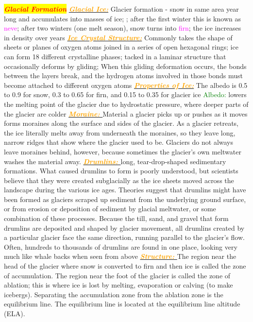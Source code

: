 \documentclass{article}
\author{SBHS Science Olympiad, Gold}
\newcommand{\red}[1]{\textcolor{red}{#1}}
\newcommand{\green}[1]{\textcolor{green}{#1}}
\newcommand{\pink}[1]{\textcolor{magenta}{#1}}
\newcommand{\orange}[1]{\textcolor{orange}{#1}}
\newcommand{\mysection}[1]{\colorbox{yellow}{{\textbf{\textbf{\textit{\red{#1}}}}}}}
\newcommand{\mysub}[1]{\underline{\textbf{{\textit{\orange{#1}}}}}}
\newcommand{\mysubsub}[1]{{{\green{#1}}}}
\newcommand{\vocab}[1]{{\pink{#1}}}
\begin{document}
	 \tiny
	\begin{multicols*}{4}
	
	
	
	
	\mysection{Glacial Formation} %
		\mysub {Glacial Ice:}
		Glacier formation - snow in same area year long and accumulates into masses of ice; ; after the first winter this is known as \vocab{neve}; after two winters (one melt season), snow turns into \vocab{firn}; the ice increases in density over years
		\mysub{Ice Crystal Structure:} 
		Commonly takes the shape of sheets or planes of oxygen atoms joined in a series of open hexagonal rings; ice can form 18 different crystalline phases; tacked in a laminar structure that occasionally deforms by gliding; When this gliding deformation occurs, the bonds between the layers break, and the hydrogen atoms involved in those bonds must become attached to different oxygen atoms
		\mysub{Properties of Ice:} The albedo is 0.5 to 0.9 for snow, 0.3 to 0.65 for firn, and 0.15 to 0.35 for glacier ice
		\mysubsub{Albedo:} lowers the melting point of the glacier due to hydrostatic pressure, where deeper parts of the glacier are colder
		\mysub{Moraine: }
		Material a glacier picks up or pushes as it moves forms moraines along the surface and sides of the glacier. As a glacier retreats, the ice literally melts away from underneath the moraines, so they leave long, narrow ridges that show where the glacier used to be. Glaciers do not always leave moraines behind, however, because sometimes the glacier’s own meltwater washes the material away.
		\mysub{Drumlins: } long, tear-drop-shaped sedimentary formations. What caused drumlins to form is poorly understood, but scientists believe that they were created subglacially as the ice sheets moved across the landscape during the various ice ages. Theories suggest that drumlins might have been formed as glaciers scraped up sediment from the underlying ground surface, or from erosion or deposition of sediment by glacial meltwater, or some combination of these processes. Because the till, sand, and gravel that form drumlins are deposited and shaped by glacier movement, all drumlins created by a particular glacier face the same direction, running parallel to the glacier's flow. Often, hundreds to thousands of drumlins are found in one place, looking very much like whale backs when seen from above
		\mysub{Structure: }The region near the head of the glacier where snow is converted to firn and then ice is called the zone of accumulation.  The region near the foot of the glacier is called the zone of ablation; this is where ice is lost by melting, evaporation or calving (to make icebergs).  Separating the accumulation zone from the ablation zone is the equilibrium line. The equilibrium line is located at the equilibrium line altitude (ELA).

\end{multicols*}
\end{document}
